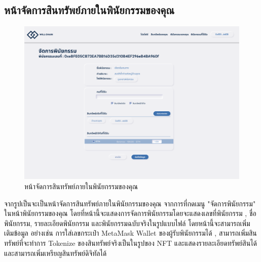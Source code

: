 \documentclass[12pt,oneside,openright,a4paper]{cpe-thai-project}
\begin{document}
\subsection{หน้าจัดการสินทรัพย์ภายในพินัยกรรมของคุณ}
		\begin{figure}[!thb]
			\centering
			\includegraphics[scale=0.2]{manageWill}
			\caption{หน้าจัดการสินทรัพย์ภายในพินัยกรรมของคุณ}
		\end{figure}
		\FloatBarrier
		\tab  จากรูปเป็นจะเป็นหน้าจัดการสินทรัพย์ภายในพินัยกรรมของคุณ จากการที่กดเมนู "จัดการพินัยกรรม" ในหน้าพินัยกรรมของคุณ โดยที่หน้านี้จะแสดงการจัดการพินัยกรรมโดยจะแสดงเลขที่พินัยกรรม , ชื่อพินัยกรรม, รายละเอียดพินัยกรรม และพินัยกรรมฉบับจริงในรูปแบบไฟล์ โดยหน้านี้จะสามารถเพิ่มเติมข้อมูล อย่างเช่น การใส่เลขกระเป๋า MetaMask Wallet ของผู้รับพินัยกรรมได้ , สามารถเพิ่มสินทรัพย์ที่จะทำการ Tokenize ของสินทรัพย์จริงเป็นในรูปของ NFT และแสดงรายละเอียดทรัพย์สินได้ และสามารถเพิ่มเหรียญสินทรัพย์ดิจิทัลได้
\end{document}
